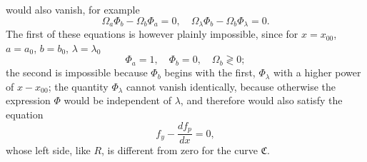 \documentclass[11pt,a4paper,leqno]{article}
\begin{document}
would also vanish, for example
\begin{equation}\tag{54}
\Omega_a\Phi_b-\Omega_b\Phi_a=0,
\quad
\Omega_\lambda\Phi_b-\Omega_b\Phi_\lambda=0.
\end{equation}
The first of these equations is however plainly impossible, since for $x=x_{00}$, $a=a_0$, $b=b_0$, $\lambda=\lambda_0$
\begin{equation}\tag{55}
\Phi_a=1,
\quad \Phi_b=0,
\quad \Omega_b\gtrless 0;
\end{equation}
the second is impossible because $\Phi_b$ begins with the first, $\Phi_\lambda$ with a higher power of $x-x_{00}$; the quantity $\Phi_\lambda$ cannot vanish identically, because otherwise the expression $\Phi$ would be independent of $\lambda$, and therefore would also satisfy the equation
\[
f_y-\frac{df_p}{dx}=0,
\]
whose left side, like $R$, is different from zero for the curve $\mathfrak{C}$.
\end{document}
